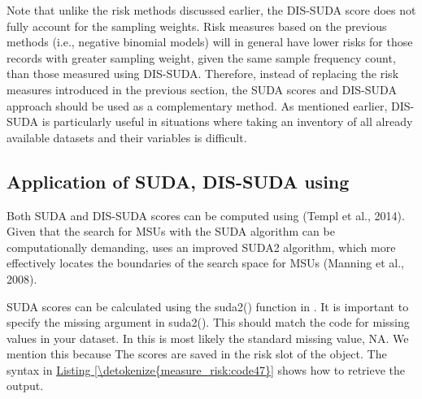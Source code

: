 \documentclass[letterpaper,10pt,english]{sphinxmanual}
\begin{document}
Note that unlike the risk methods discussed earlier, the DIS-SUDA score
does not fully account for the sampling weights. Risk measures based on
the previous methods (i.e., negative binomial models) will in general
have lower risks for those records with greater sampling weight, given
the same sample frequency count, than those measured using DIS-SUDA.
Therefore, instead of replacing the risk measures introduced in the
previous section, the SUDA scores and DIS-SUDA approach should be used
as a complementary method. As mentioned earlier, DIS-SUDA is
particularly useful in situations where taking an inventory of all
already available datasets and their variables is difficult.


\subsection{Application of SUDA, DIS-SUDA using }
\label{\detokenize{measure_risk:application-of-suda-dis-suda-using-sdcmicro}}
Both SUDA and DIS-SUDA scores can be computed using  (Templ et
al., 2014). Given that the search for MSUs with the SUDA algorithm can
be computationally demanding,  uses an improved SUDA2
algorithm, which more effectively locates the boundaries of the search
space for MSUs (Manning et al., 2008).

SUDA scores can be calculated using the suda2() function in .
It is important to specify the missing argument in suda2(). This should
match the code for missing values in your dataset. In  this is most
likely the  standard missing value, NA. We mention this because  The scores are saved in the risk slot of the 
object. The syntax in \hyperref[\detokenize{measure_risk:code47}]{Listing \ref{\detokenize{measure_risk:code47}}} shows how to retrieve the output.
\end{document}
